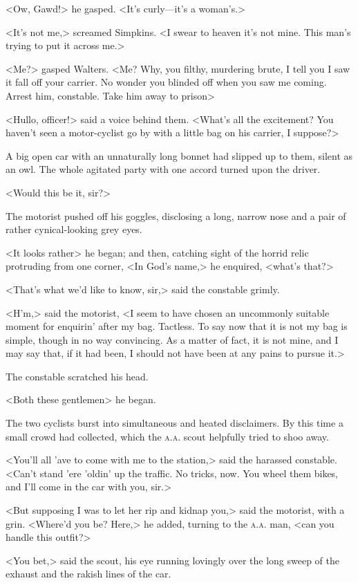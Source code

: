 <Ow, Gawd!> he gasped. <It's curly—it's a woman's.>

<It's not me,> screamed Simpkins. <I swear to heaven it's not mine. This man's trying to put it across me.>

<Me?> gasped Walters. <Me? Why, you filthy, murdering brute, I tell you I saw it fall off your carrier. No wonder you blinded off when you saw me coming. Arrest him, constable. Take him away to prison\longdash>

<Hullo, officer!> said a voice behind them. <What's all the excitement? You haven't seen a motor-cyclist go by with a little bag on his carrier, I suppose?>

A big open car with an unnaturally long bonnet had slipped up to them, silent as an owl. The whole agitated party with one accord turned upon the driver.

<Would this be it, sir?>

The motorist pushed off his goggles, disclosing a long, narrow nose and a pair of rather cynical-looking grey eyes.

<It looks rather\longdash> he began; and then, catching sight of the horrid relic protruding from one corner, <In God's name,> he enquired, <what's that?>

<That's what we'd like to know, sir,> said the constable grimly.

<H'm,> said the motorist, <I seem to have chosen an uncommonly suitable moment for enquirin' after my bag. Tactless. To say now that it is not my bag is simple, though in no way convincing. As a matter of fact, it is not mine, and I may say that, if it had been, I should not have been at any pains to pursue it.>

The constable scratched his head.

<Both these gentlemen\longdash> he began.

The two cyclists burst into simultaneous and heated disclaimers. By this time a small crowd had collected, which the \textsc{a.a.} scout helpfully tried to shoo away.

<You'll all 'ave to come with me to the station,> said the harassed constable. <Can't stand 'ere 'oldin' up the traffic. No tricks, now. You wheel them bikes, and I'll come in the car with you, sir.>

<But supposing I was to let her rip and kidnap you,> said the motorist, with a grin. <Where'd you be? Here,> he added, turning to the \textsc{a.a.} man, <can you handle this outfit?>

<You bet,> said the scout, his eye running lovingly over the long sweep of the exhaust and the rakish lines of the car.

